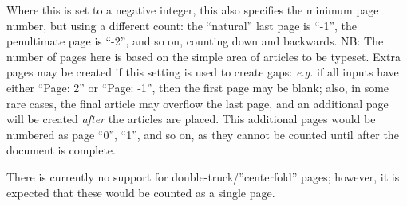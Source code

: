 \documentclass[a4paper,DIV=11]{scrartcl}
\begin{document}
\begin{multicols}{2}
{  Where this is set to a negative integer, this also specifies the
  minimum page number, but using a different count: the ``natural''
  last page is ``-1'', the penultimate page is ``-2'', and so on,
  counting down and backwards. NB: The number of pages here is based
  on the simple area of articles to be typeset. Extra pages may be
  created if this setting is used to create gaps: \textit{e.g.} if all inputs
  have either ``Page: 2'' or ``Page: -1'', then the first page may be
  blank; also, in some rare cases, the final article may overflow the
  last page, and an additional page will be created \textit{after} the
  articles are placed. This additional pages would be numbered as page
  ``0'', ``1'', and so on, as they cannot be counted until after the
  document is complete.

  There is currently no support for double-truck/''centerfold'' pages;
  however, it is expected that these would be counted as a single
  page.

}
\end{multicols}
\end{document}
